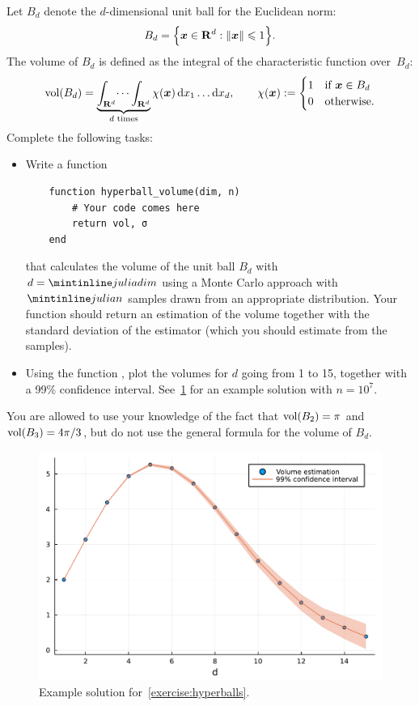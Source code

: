 \begin{compexercise}
    \label{exercise:hyperballs}
    Let $B_{d}$ denote the $d$-dimensional unit ball for the Euclidean norm:
    \[
        B_{d} = \Bigl\{ \mathbf{\boldsymbol{x}} \in \mathbf R^d : \lVert\mathbf{\boldsymbol{x}}\rVert \leqslant 1 \Bigr\}.
    \]
    The volume of $B_{d}$ is defined as the integral of the characteristic function over~$B_d$:
    \[
        {\rm vol}(B_d) = \underbrace{\int_{\mathbf R^d} \dots \int_{\mathbf R^d}}_{\text{$d$ times}} \chi(\mathbf{\boldsymbol{x}}) \, \mathrm d x_1 \dots \mathrm d x_d,
        \qquad
        \chi(\mathbf{\boldsymbol{x}}) :=
        \begin{cases}
            1 & \text{if $\mathbf{\boldsymbol{x}} \in B_d$} \\
            0 & \text{otherwise.}
        \end{cases}
    \]
    Complete the following tasks:
    \begin{itemize}
        \item
            Write a function
    \begin{verbatim}
    function hyperball_volume(dim, n)
        # Your code comes here
        return vol, σ
    end
    \end{verbatim}
            that calculates the volume of the unit ball $B_{d}$ with $d = \julia{dim}$
            using a Monte Carlo approach with~$\julia{n}$ samples drawn from an appropriate distribution.
            Your function should return an estimation of the volume
            together with the standard deviation of the estimator
            (which you should estimate from the samples).

        \item
            Using the function ,
            plot the volumes for $d$ going from 1 to 15,
            together with a 99\% confidence interval.
            See~\cref{fig:hyperballs} for an example solution with $n = 10^7$.
    \end{itemize}
    You are allowed to use your knowledge of the fact that
    ${\rm vol}(B_2) = \pi$ and ${\rm vol}(B_3) = 4\pi/3$,
    but do not use the general formula for the volume of $B_d$.
\end{compexercise}
\begin{figure}[ht]
    \centering
    \includegraphics[width=0.8\linewidth]{figures/hyperballs.pdf}
    \caption{Example solution for~\cref{exercise:hyperballs}.}%
    \label{fig:hyperballs}
\end{figure}

